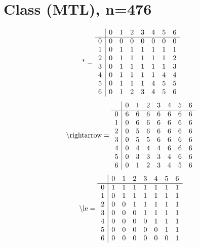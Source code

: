 \documentclass[11pt]{article}
\begin{document}
\section{Class (MTL), n=476}
\[\text{*} = 
\begin{array}{r | r r r r r r r}
 & 0 & 1 & 2 & 3 & 4 & 5 & 6 \\ \hline
0 & 0 & 0 & 0 & 0 & 0 & 0 & 0 \\
1 & 0 & 1 & 1 & 1 & 1 & 1 & 1 \\
2 & 0 & 1 & 1 & 1 & 1 & 1 & 2 \\
3 & 0 & 1 & 1 & 1 & 1 & 1 & 3 \\
4 & 0 & 1 & 1 & 1 & 1 & 4 & 4 \\
5 & 0 & 1 & 1 & 1 & 4 & 5 & 5 \\
6 & 0 & 1 & 2 & 3 & 4 & 5 & 6 \\
\end{array}
\]
\[\text{\textbackslash rightarrow} = 
\begin{array}{r | r r r r r r r}
 & 0 & 1 & 2 & 3 & 4 & 5 & 6 \\ \hline
0 & 6 & 6 & 6 & 6 & 6 & 6 & 6 \\
1 & 0 & 6 & 6 & 6 & 6 & 6 & 6 \\
2 & 0 & 5 & 6 & 6 & 6 & 6 & 6 \\
3 & 0 & 5 & 5 & 6 & 6 & 6 & 6 \\
4 & 0 & 4 & 4 & 4 & 6 & 6 & 6 \\
5 & 0 & 3 & 3 & 3 & 4 & 6 & 6 \\
6 & 0 & 1 & 2 & 3 & 4 & 5 & 6 \\
\end{array}
\]
\[\text{\textbackslash le} = 
\begin{array}{r | r r r r r r r}
 & 0 & 1 & 2 & 3 & 4 & 5 & 6 \\ \hline
0 & 1 & 1 & 1 & 1 & 1 & 1 & 1 \\
1 & 0 & 1 & 1 & 1 & 1 & 1 & 1 \\
2 & 0 & 0 & 1 & 1 & 1 & 1 & 1 \\
3 & 0 & 0 & 0 & 1 & 1 & 1 & 1 \\
4 & 0 & 0 & 0 & 0 & 1 & 1 & 1 \\
5 & 0 & 0 & 0 & 0 & 0 & 1 & 1 \\
6 & 0 & 0 & 0 & 0 & 0 & 0 & 1 \\
\end{array}
\]
\end{document}
